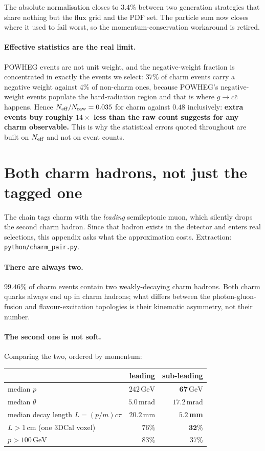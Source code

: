 \documentclass[11pt,a4paper]{article}
\newcommand{\GeV}{\,\mathrm{GeV}}
\begin{document}
\noindent
The absolute normalisation closes to $3.4\%$ between two generation strategies
that share nothing but the flux grid and the PDF set. The particle sum now closes
where it used to fail worst, so the momentum-conservation workaround is retired.

\paragraph{Effective statistics are the real limit.} POWHEG events are not unit
weight, and the negative-weight fraction is concentrated in exactly the events we
select: $37\%$ of charm events carry a negative weight against $4\%$ of
non-charm ones, because POWHEG's negative-weight events populate the
hard-radiation region and that is where $g\to c\bar{c}$ happens. Hence
$N_{\rm eff}/N_{\rm raw} = 0.035$ for charm against $0.48$ inclusively:
\textbf{extra events buy roughly $14\times$ less than the raw count suggests for
any charm observable.} This is why the statistical errors quoted throughout are
built on $N_{\rm eff}$ and not on event counts.

\section{Both charm hadrons, not just the tagged one}
\label{app:pair}

The chain tags charm with the \emph{leading} semileptonic muon, which silently
drops the second charm hadron. Since that hadron exists in the detector and
enters real selections, this appendix asks what the approximation costs.
Extraction: \texttt{python/charm\_pair.py}.

\paragraph{There are always two.} $99.46\%$ of charm events contain two
weakly-decaying charm hadrons. Both charm quarks always end up in charm hadrons;
what differs between the photon-gluon-fusion and flavour-excitation topologies is
their kinematic asymmetry, not their number.

\paragraph{The second one is not soft.} Comparing the two, ordered by momentum:

\begin{center}\small
\begin{tabular}{lrr}
\toprule
 & leading & sub-leading \\
\midrule
median $p$ & $242\GeV$ & $\mathbf{67\GeV}$ \\
median $\theta$ & $5.0$\,mrad & $17.2$\,mrad \\
median decay length $L=(p/m)c\tau$ & $20.2$\,mm & $\mathbf{5.2}$\,\textbf{mm} \\
$L>1$\,cm (one 3DCal voxel) & $76\%$ & $\mathbf{32\%}$ \\
$p>100\GeV$ & $83\%$ & $37\%$ \\
\bottomrule
\end{tabular}
\end{center}
\end{document}
